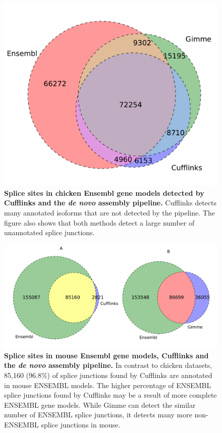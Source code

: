 \documentclass[10pt]{article}
\begin{document}
\begin{figure}[!ht]
\begin{center}
\includegraphics[width=5in]{chick_venn.pdf}
\end{center}
\caption{
{\bf Splice sites in chicken Ensembl gene models detected by Cufflinks and the
{\em de novo} assembly pipeline.} Cufflinks detects many annotated isoforms
that are not detected by the pipeline.  The figure also shows that both methods
detect a large number of unannotated splice junctions.}
\label{chick_venn}
\end{figure}


\begin{figure}[!ht]
\begin{center}
\includegraphics[width=5in]{mouse_venn.pdf}
\end{center}
\caption{
{\bf Splice sites in mouse Ensembl gene models, Cufflinks and the \emph{de
novo} assembly pipeline.} In contrast to chicken datasets, 85,160 (96.8\%) of
splice junctions found by Cufflinks are annotated in mouse ENSEMBL models. The
higher percentage of ENSEMBL splice junctions found by Cufflinks may be a
result of more complete ENSEMBL gene models. While Gimme can detect the similar
number of ENSEMBL splice junctions, it detects many more non-ENSEMBL splice
junctions in mouse.}
\label{mus_venn}
\end{figure}
\end{document}
